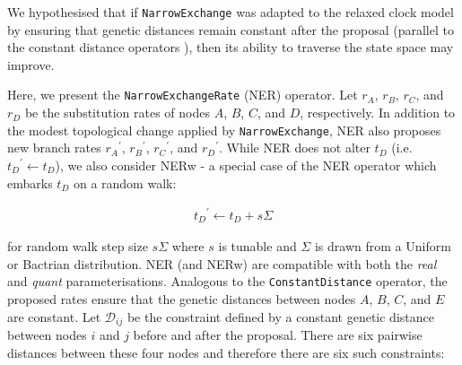 \documentclass[10pt,letterpaper]{article}
\begin{document}
We hypothesised that if \texttt{NarrowExchange} was adapted to the relaxed clock model by ensuring that genetic distances remain constant after the proposal (parallel to the constant distance operators \cite{zhang2020improving}), then its ability to traverse the state space may improve. 




Here, we present the \texttt{NarrowExchangeRate} (NER) operator. 
Let $r_A$, $r_B$, $r_C$, and $r_D$ be the substitution rates of nodes $A$, $B$, $C$, and $D$, respectively. 
In addition to the modest topological change applied by \texttt{NarrowExchange}, NER also proposes new branch rates ${r_A}^\prime$, ${r_B}^\prime$, ${r_C}^\prime$, and ${r_D}^\prime$. While NER does not alter $t_D$ (i.e. ${t_D}^\prime \leftarrow t_D$), we also consider NERw - a special case of the NER operator which embarks $t_D$ on a random walk:

\begin{align}
	{t_D}^\prime \leftarrow t_D + s\Sigma
\end{align}

\noindent
for random walk step size $s\Sigma$ where $s$ is tunable and $\Sigma$ is drawn from a Uniform or Bactrian distribution. NER (and NERw) are compatible with both the \textit{real} and \textit{quant} parameterisations. 
Analogous to the \texttt{ConstantDistance} operator, the proposed rates ensure that the genetic distances between nodes $A$, $B$, $C$, and $E$ are constant. 
Let $\mathcal{D}_{ij}$ be the constraint defined by a constant genetic distance between nodes $i$ and $j$ before and after the proposal.
There are six pairwise distances between these four nodes and therefore there are six such constraints:
\end{document}
